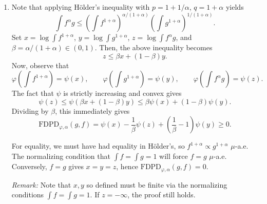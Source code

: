 \documentclass[11pt]{article}
\begin{document}
\begin{enumerate}
        \item Note that applying H\"older's inequality with $p = 1 +
        1/\alpha$, $q = 1 + \alpha$ yields \[
            \int f^\alpha g \leq \left(\int f^{1 + \alpha}\right)^{\alpha / (1 + \alpha)} \left(\int g^{1 + \alpha}\right)^{1/(1 + \alpha)}.
        \] Set $x = \log \int f^{1 + \alpha}$, $y = \log \int g^{1 + \alpha}$,
        $z = \log \int f^\alpha g$, and $\beta = \alpha / (1 + \alpha) \in (0,
        1)$.
        Then, the above inequality becomes \[
            z \leq \beta x + (1 - \beta)y.
        \] Now, observe that \[
            \varphi\left(\int f^{1 + \alpha}\right) = \psi(x), \qquad
            \varphi\left(\int g^{1 + \alpha}\right) = \psi(y), \qquad
            \varphi\left(\int f^{\alpha}g\right)    = \psi(z).
        \] The fact that $\psi$ is strictly increasing and convex gives \[
            \psi(z) \leq \psi(\beta x + (1 - \beta)y) \leq \beta \psi(x) + (1 - \beta) \psi(y).
        \] Dividing by $\beta$, this immediately gives \[
            \text{FDPD}_{\varphi, \alpha}(g, f) = \psi(x) - \frac{1}{\beta}\psi(z) + \left(\frac{1}{\beta} - 1\right)\psi(y) \geq 0.
        \]

        For equality, we must have had equality in H\"older's, so $f^{1 +
        \alpha} \propto g^{1 + \alpha}$ $\mu$-a.e.
        The normalizing condition that $\int f = \int g = 1$ will force $f =
        g$ $\mu$-a.e.
        Conversely, $f = g$ gives $x = y = z$, hence $\text{FDPD}_{\varphi,
        \alpha}(g, f) = 0$.

        \emph{Remark:} Note that $x, y$ so defined must be finite via the
        normalizing conditions $\int f = \int g = 1$.
        If $z = -\infty$, the proof still holds.
    \end{enumerate}
\end{document}
